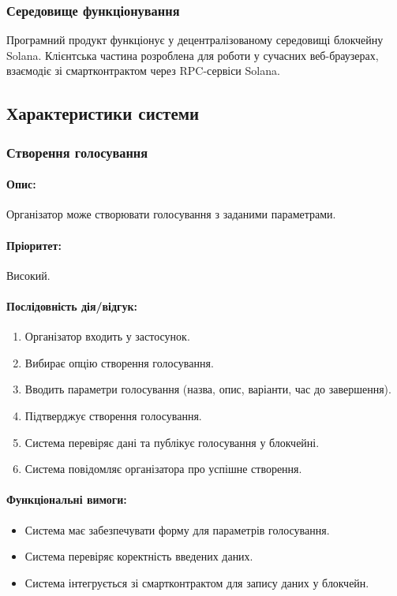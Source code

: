 \documentclass[14pt]{extreport}
\newcounter{req}[subsubsection]
\newcommand\req{\arabic{req}\stepcounter{req}}
\begin{document}
  \subsubsection{Середовище функціонування}
  Програмний продукт функціонує у децентралізованому середовищі блокчейну Solana. Клієнтська частина розроблена для роботи у сучасних веб-браузерах, взаємодіє зі смартконтрактом через RPC-сервіси Solana.

  \subsection{Характеристики системи}
  \subsubsection{Створення голосування}  
  \paragraph{Опис:} Організатор може створювати голосування з заданими параметрами.  
  \paragraph{Пріоритет:} Високий.  
  \paragraph{Послідовність дія/відгук:}  
  \begin{enumerate}  
      \item Організатор входить у застосунок.  
      \item Вибирає опцію створення голосування.  
      \item Вводить параметри голосування (назва, опис, варіанти, час до завершення).  
      \item Підтверджує створення голосування.  
      \item Система перевіряє дані та публікує голосування у блокчейні.  
      \item Система повідомляє організатора про успішне створення.  
  \end{enumerate}
  \paragraph{Функціональні вимоги:}
  \begin{itemize}[leftmargin=*,label=REQ-.\req:]  
      \item Система має забезпечувати форму для параметрів голосування.
      \item Система перевіряє коректність введених даних.
      \item Система інтегрується зі смартконтрактом для запису даних у блокчейн.  
  \end{itemize}
\end{document}
